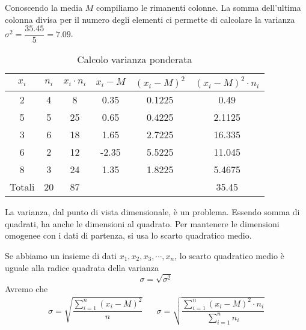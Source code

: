 Conoscendo la media $M$  compiliamo le rimanenti colonne. La somma dell'ultima colonna divisa per il numero degli elementi ci permette di  calcolare la varianza $\sigma^2=\dfrac{\num{35.45}}{5}=\num{7.09}$.
\begin{table}
	\centering
	\begin{tabular}{S[table-format=1.0]S[table-format=2.0]S[table-format=2.0]S[table-format=1.2]S[table-format=1.4]S[table-format=2.4] }
		\toprule
	{$x_i$}	&{$n_i$}  & {$x_i\cdot n_i$} & {$x_i-M$} & {$(x_i-M )^2$} & {$(x_i-M)^2\cdot n_i $ } \\
			& 4 & 8  & 0.35 &0.1225  & 0.49 \\ 
		5	& 5 & 25 & 0.65 &0.4225  & 2.1125 \\ 
		3	& 6 & 18 & 1.65 &2.7225  & 16.335 \\ 
		6	& 2 & 12 & -2.35&5.5225  & 11.045 \\ 
		8	& 3 & 24 & 1.35 &1.8225  & 5.4675 \\
		\midrule 
	{Totali}& 20& 87 &  &  & 35.45 \\
		\bottomrule 
	\end{tabular} 
	\caption{Calcolo varianza ponderata}
	\label{tab:CalcoloVarianzaPonderata}
\end{table}

La varianza,  dal punto di vista dimensionale, è un problema.  Essendo somma di quadrati, ha anche le dimensioni al quadrato. Per mantenere le dimensioni omogenee con i dati  di partenza, si usa lo scarto quadratico medio. 
\begin{defn}
	Se abbiamo un insieme di dati $x_{1},x_{2},x_{3},\cdots,x_{n}$, lo scarto quadratico medio è  uguale alla radice quadrata della varianza \[\sigma=\sqrt{\sigma^2} \]
	Avremo che 
	\begin{align*}
		\sigma=\sqrt{\dfrac{\sum_{i=1}^{n}(x_{i}-M)^2}{n}}&&\sigma=\sqrt{\dfrac{\sum_{i=1}^{n}(x_{i}-M)^{2}\cdot n_{i}}{\sum_{i=1}^{n} n_{i}}}
	\end{align*}
\end{defn}